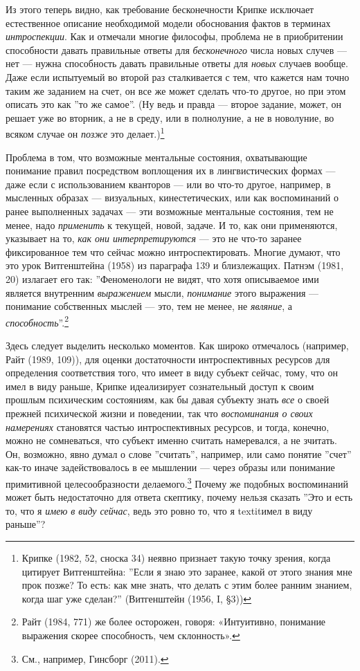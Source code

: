\documentclass[11pt]{book}
\begin{document}
Из этого теперь видно, как требование бесконечности Крипке исключает естественное описание необходимой модели обоснования фактов в терминах \textit{интроспекции}. Как и отмечали многие философы, проблема не в приобритении способности давать правильные ответы для \textit{бесконечного} числа новых случев --- нет --- нужна способность давать правильные ответы для \textit{новых} случаев вообще. Даже если испытуемый во второй раз сталкивается с тем, что кажется нам точно таким же заданием на счет, он все же может сделать что-то другое, но при этом описать это как ''то же самое''. (Ну ведь и правда --- второе задание, может, он решает уже во вторник, а не в среду, или в полнолуние, а не в новолуние, во всяком случае он \textit{позже} это делает.)\footnote{Крипке (1982, 52, сноска 34) неявно признает такую точку зрения, когда цитирует Витгенштейна: ''Если я знаю это заранее, какой от этого знания мне прок позже? То есть: как мне знать, что делать с этим более ранним знанием, когда шаг уже сделан?'' (Витгенштейн (1956, I, §3))}

Проблема в том, что возможные ментальные состояния, охватывающие понимание правил посредством воплощения их в лингвистических формах --- даже если с использованием кванторов --- или во что-то другое, например, в мысленных образах --- визуальных, кинестетических, или как воспоминаний о ранее выполненных задачах --- эти возможные ментальные состояния, тем не менее, надо \textit{применить} к текущей, новой, задаче. И то, как они применяются, указывает на то, \textit{как они интерпретируются} --- это не что-то заранее фиксированное тем что сейчас можно интроспектировать. Многие думают, что это урок Витгенштейна (1958) из параграфа 139 и близлежащих. Патнэм (1981, 20) излагает его так: ''Феноменологи не видят, что хотя описываемое ими является внутренним \textit{выражением} мысли, \textit{понимание} этого выражения --- понимание собственных мыслей --- это, тем не менее, не \textit{являние}, а \textit{способность}''.\footnote{Райт (1984, 771) же более осторожен, говоря: «Интуитивно, понимание выражения скорее способность, чем склонность».}

Здесь следует выделить несколько моментов. Как широко отмечалось (например, Райт (1989, 109)), для оценки достаточности интроспективных ресурсов для определения соответствия того, что имеет в виду субъект сейчас, тому, что он имел в виду раньше, Крипке идеализирует сознательный доступ к своим прошлым психическим состояниям, как бы давая субъекту знать \textit{все} о своей прежней психической жизни и поведении, так что \textit{воспоминания о своих намерениях} становятся частью интроспективных ресурсов, и тогда, конечно, можно не сомневаться, что субъект именно считать намеревался, а не зчитать. Он, возможно, явно думал о слове ''считать'', например, или само понятие ''счет'' как-то иначе задействовалось в ее мышлении --- через образы или понимание примитивной целесообразности делаемого.\footnote{См., например, Гинсборг (2011).} Почему же подобных воспоминаний может быть недостаточно для ответа скептику, почему нельзя сказать ''Это и есть то, что я \textit{имею в виду сейчас}, ведь это ровно то, что я textit{имел в виду раньше}''?
\end{document}
